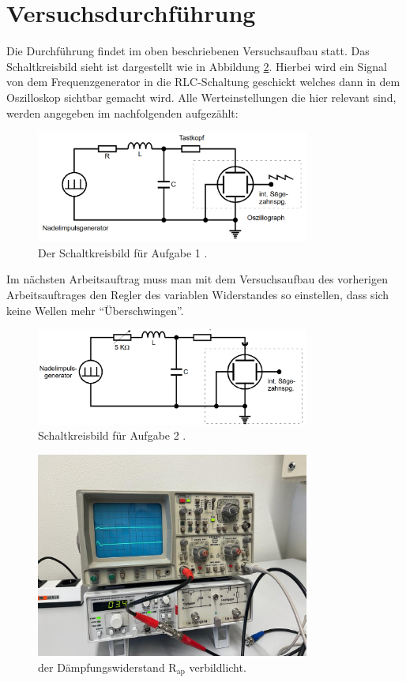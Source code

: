 \section{Versuchsdurchführung}

Die Durchführung findet im oben beschriebenen Versuchsaufbau statt.
Das Schaltkreisbild sieht ist dargestellt wie in Abbildung \ref{Abbildung7}.
Hierbei wird ein Signal von dem Frequenzgenerator in die RLC-Schaltung geschickt welches dann in dem Oszilloskop sichtbar gemacht wird.
Alle Werteinstellungen die hier relevant sind, werden angegeben im nachfolgenden aufgezählt: 


\begin{figure}[H]
    \centering
    \includegraphics[width=90mm]{bilder/Ab6.png}
    \caption{Der Schaltkreisbild für Aufgabe 1 \cite[11]{GedUErzSch}. \label{Abbildung6}}
\end{figure}
 

\begin{flushleft}
    Im nächsten Arbeitsauftrag muss man mit dem Versuchsaufbau des vorherigen Arbeitsauftrages den Regler des variablen Widerstandes so einstellen,
    dass sich keine Wellen mehr \enquote{Überschwingen}. \\
\end{flushleft}


\begin{figure}[H]
    \centering
    \includegraphics[width=90mm]{bilder/Ab7.png}
    \caption{Schaltkreisbild für Aufgabe 2 \cite[12]{GedUErzSch}. \label{Abbildung7}}
\end{figure}


\begin{figure}[H]
    \centering
    \includegraphics[width=90mm]{bilder/Ab8.jpeg}
    \caption{der Dämpfungswiderstand $\text{R}_\text{ap}$ verbildlicht. \label{Abbildung8}}
\end{figure}


